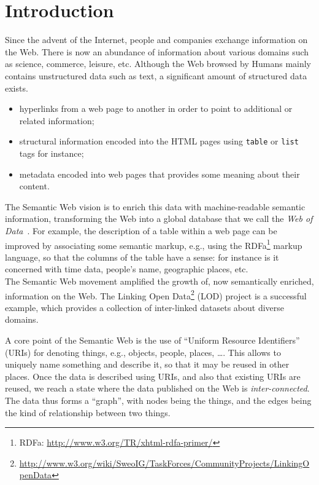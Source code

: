 \chapter{Introduction}
\label{chap:introduction}

Since the advent of the Internet, people and companies exchange information on the Web. There is now an abundance of information about various domains such as science, commerce, leisure, etc. Although the Web browsed by Humans mainly contains unstructured data such as text, a significant amount of structured data exists.

\begin{itemize}
\item hyperlinks from a web page to another in order to point to additional or related information;
\item structural information encoded into the HTML pages using \texttt{table} or \texttt{list} tags for instance;
\item metadata encoded into web pages that provides some meaning about their content.
\end{itemize}

The Semantic Web vision is to enrich this data with machine-readable semantic information, transforming the Web into a global database that we call the \emph{Web of Data}~\cite{bizer:2009:linked}. For example, the description of a table within a web page can be improved by associating some semantic markup, e.g., using the RDFa\footnote{RDFa: \url{http://www.w3.org/TR/xhtml-rdfa-primer/}} markup language, so that the columns of the table have a sense: for instance is it concerned with time data, people's name, geographic places, etc.\\

The Semantic Web movement amplified the growth of, now semantically enriched, information on the Web. The Linking Open Data\footnote{\url{http://www.w3.org/wiki/SweoIG/TaskForces/CommunityProjects/LinkingOpenData}} (LOD) project is a successful example, which provides a collection of inter-linked datasets about diverse domains.

A core point of the Semantic Web is the use of ``Uniform Resource Identifiers'' (URIs) for denoting things, e.g., objects, people, places, \ldots. This allows to uniquely name something and describe it, so that it may be reused in other places. Once the data is described using URIs, and also that existing URIs are reused, we reach a state where the data published on the Web is \emph{inter-connected}. The data thus forms a ``graph'', with nodes being the things, and the edges being the kind of relationship between two things.

